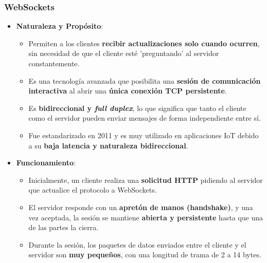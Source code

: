 \documentclass{report}
\begin{document}
\subsubsection{WebSockets}
\begin{itemize}
    \item \textbf{Naturaleza y Propósito}:
    \begin{itemize}
        \item Permiten a los clientes \textbf{recibir actualizaciones solo cuando ocurren}, sin necesidad de que el cliente esté  'preguntando' 
        al servidor constantemente.
        \item Es una tecnología avanzada que posibilita una \textbf{sesión de comunicación interactiva} al abrir una \textbf{única conexión TCP 
        persistente}.
        \item Es \textbf{bidireccional y \textit{full duplex}}, lo que significa que tanto el cliente como el servidor pueden enviar mensajes de 
        forma independiente entre sí.
        \item Fue estandarizado en 2011 y es muy utilizado en aplicaciones IoT debido a su \textbf{baja latencia y naturaleza bidireccional}.
    \end{itemize}

    \item \textbf{Funcionamiento}:
    \begin{itemize}
        \item Inicialmente, un cliente realiza una \textbf{solicitud HTTP} pidiendo al servidor que actualice el protocolo a WebSockets.
        \item El servidor responde con un \textbf{apretón de manos (handshake)}, y una vez aceptada, la sesión se mantiene \textbf{abierta y persistente} 
        hasta que una de las partes la cierra.
        \item Durante la sesión, los paquetes de datos enviados entre el cliente y el servidor son \textbf{muy pequeños}, con una longitud de trama de 2 
        a 14 bytes.
    \end{itemize}
\end{itemize}
\end{document}
